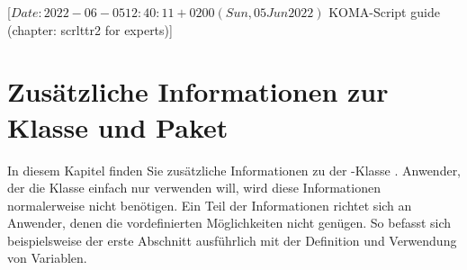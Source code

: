 %
%
%
%
%
%
%

%
                 [$Date: 2022-06-05 12:40:11 +0200 (Sun, 05 Jun 2022) $
                  KOMA-Script guide (chapter: scrlttr2 for experts)]

\chapter{Zusätzliche Informationen zur
  Klasse  und Paket }

\BeginIndexGroup%
%
In diesem Kapitel finden Sie zusätzliche Informationen zu der
\KOMAScript-Klasse . %
Anwender, der die Klasse einfach nur verwenden will, wird diese Informationen
normalerweise nicht benötigen. Ein Teil der Informationen richtet sich an
Anwender, denen die vordefinierten Möglichkeiten nicht genügen. So
befasst sich beispielsweise der erste Abschnitt ausführlich mit der Definition
und Verwendung von Variablen.%
\iffalse%
\ Darüber hinaus finden sich in diesem Kapitel auch Informationen über
Möglichkeiten, die aus Gründen der Verbesserung der Kompatibilität zur
obsoleten \KOMAScript-Klasse \Class{scrlettr} geschaffen wurden. Es wird auch
ausführlich erklärt, wie man einen Brief dieser veralteten Klasse auf die
aktuelle Briefklasse übertragen kann.  \fi

